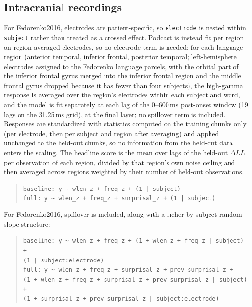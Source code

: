 \subsection{Intracranial recordings}

For Fedorenko2016, electrodes are patient-specific, so \texttt{electrode} is nested within \texttt{subject} rather than treated as a crossed effect. Podcast is instead fit per region on region-averaged electrodes, so no electrode term is needed: for each language region (anterior temporal, inferior frontal, posterior temporal; left-hemisphere electrodes assigned to the Fedorenko language parcels, with the orbital part of the inferior frontal gyrus merged into the inferior frontal region and the middle frontal gyrus dropped because it has fewer than four subjects), the high-gamma response is averaged over the region's electrodes within each subject and word, and the model is fit separately at each lag of the 0--600\,ms post-onset window (19 lags on the 31.25\,ms grid), at the final layer; no spillover term is included. Responses are standardized with statistics computed on the training chunks only (per electrode, then per subject and region after averaging) and applied unchanged to the held-out chunks, so no information from the held-out data enters the scaling. The headline score is the mean over lags of the held-out $\Delta LL$ per observation of each region, divided by that region's own noise ceiling and then averaged across regions weighted by their number of held-out observations.
\begin{quote}
\texttt{baseline:\ y \textasciitilde\ wlen\_z + freq\_z + (1 | subject)}\\
\texttt{full:\ y \textasciitilde\ wlen\_z + freq\_z + surprisal\_z + (1 | subject)}
\end{quote}

For Fedorenko2016, spillover is included, along with a richer by-subject random-slope structure:
\begin{quote}
\texttt{baseline:\ y \textasciitilde\ wlen\_z + freq\_z + (1 + wlen\_z + freq\_z | subject) +}\\
\texttt{\phantom{baseline:\ y \textasciitilde\ }(1 | subject:electrode)}\\
\texttt{full:\ y \textasciitilde\ wlen\_z + freq\_z + surprisal\_z + prev\_surprisal\_z +}\\
\texttt{\phantom{full:\ y \textasciitilde\ }(1 + wlen\_z + freq\_z + surprisal\_z + prev\_surprisal\_z | subject) +}\\
\texttt{\phantom{full:\ y \textasciitilde\ }(1 + surprisal\_z + prev\_surprisal\_z | subject:electrode)}
\end{quote}
